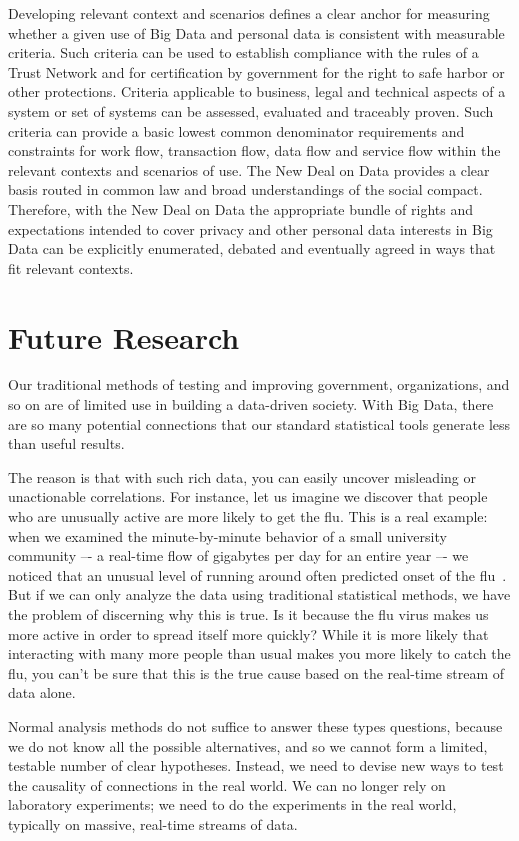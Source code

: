  
Developing relevant context and scenarios defines a clear anchor for measuring whether a given use of Big Data and personal data is consistent with measurable criteria.  Such criteria can be used to establish compliance with the rules of a Trust Network and for certification by government for the right to safe harbor or other protections.  Criteria applicable to business, legal and technical aspects of a system or set of systems can be assessed, evaluated and traceably proven. Such criteria can provide a basic lowest common denominator requirements and constraints for work flow, transaction flow, data flow and service flow within the relevant contexts and scenarios of use.  The New Deal on Data provides a clear basis routed in common law and broad understandings of the social compact.  Therefore, with the New Deal on Data the appropriate bundle of rights and expectations intended to cover privacy and other personal data interests in Big Data can be explicitly enumerated, debated and eventually agreed in ways that fit relevant contexts.  

\section{Future Research }

Our traditional methods of testing and improving government, organizations, and so on are of limited use in building a data-driven society.  With Big Data, there are so many potential connections that our standard statistical tools generate less than useful results.  

The reason is that with such rich data, you can easily uncover misleading or unactionable correlations.
For instance, let us imagine we discover that people who are unusually active are more likely to get the flu.
This is a real example: when we examined the minute-by-minute behavior of a small university community –- a real-time flow of gigabytes per day for an entire year –- we noticed that an unusual level of running around often predicted onset of the flu~\cite{madan2010social}.
But if we can only analyze the data using traditional statistical methods, we have the problem of discerning why this is true.
Is it because the flu virus makes us more active in order to spread itself more quickly?
While it is more likely that interacting with many more people than usual makes you more likely to catch the flu, you can't be sure that this is the true cause based on the real-time stream of data alone.

Normal analysis methods do not suffice to answer these types questions, because we do not know all the possible alternatives, and so we cannot form a limited, testable number of clear hypotheses.
Instead, we need to devise new ways to test the causality of connections in the real world.
We can no longer rely on laboratory experiments; we need to do the experiments in the real world, typically on massive, real-time streams of data.

